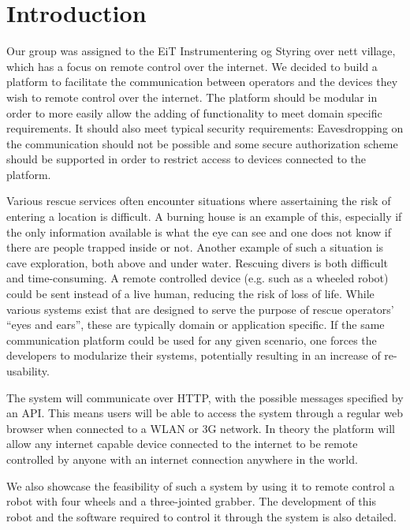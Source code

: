 \chapter{Introduction}
Our group was assigned to the EiT Instrumentering og Styring over nett village, which has a focus on remote control over the internet.
We decided to build a platform to facilitate the communication between operators and the devices they wish to remote control over the internet.
The platform should be modular in order to more easily allow the adding of functionality to meet domain specific requirements.
It should also meet typical security requirements: Eavesdropping on the communication should not be possible and some secure authorization scheme should be supported in order to restrict access to devices connected to the platform.

Various rescue services often encounter situations where assertaining the risk of entering a location is difficult. A burning house is an example of this, especially if the only information available is what the eye can see and one does not know if there are people trapped inside or not.
Another example of such a situation is cave exploration, both above and under water.
Rescuing divers is both difficult and time-consuming.  %
A remote controlled device (e.g. such as a wheeled robot) could be sent instead of a live human, reducing the risk of loss of life.
While various systems exist that are designed to serve the purpose of rescue operators' ``eyes and ears'', these are typically domain or application specific.
If the same communication platform could be used for any given scenario, one forces the developers to modularize their systems, potentially resulting in an increase of re-usability.

The system will communicate over HTTP, with the possible messages specified by an API.
This means users will be able to access the system through a regular web browser when connected to a WLAN or 3G network.
In theory the platform will allow any internet capable device connected to the internet to be remote controlled by anyone with an internet connection anywhere in the world.

We also showcase the feasibility of such a system by using it to remote control a robot with four wheels and a three-jointed grabber.
The development of this robot and the software required to control it through the system is also detailed.

